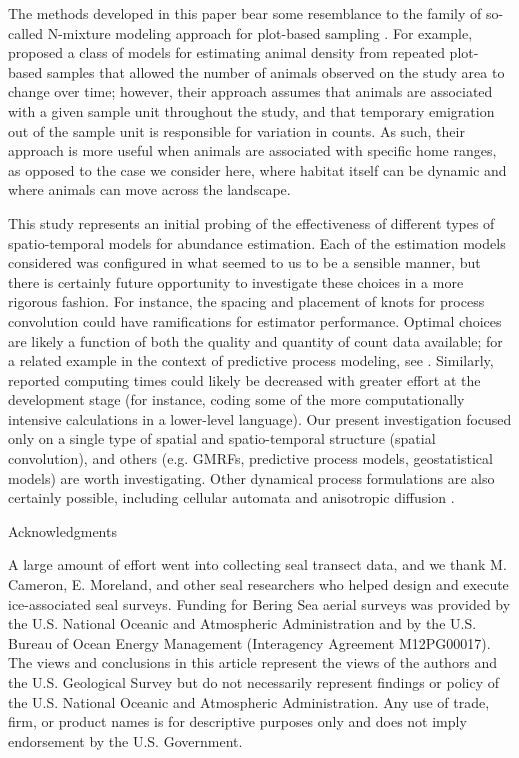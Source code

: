 \documentclass[12pt,english]{article}
\begin{document}
\begin{spacing}{1.9}
The methods developed in this paper bear some resemblance to the family of so-called N-mixture modeling approach for plot-based sampling \citep{Royle2004}.  For example, \citet{ChandlerEtAl2011} proposed a class of models for estimating animal density from repeated plot-based samples that allowed the number of animals observed on the study area to change over time; however, their approach assumes that animals are associated with a given sample unit throughout the study, and that temporary emigration out of the sample unit is responsible for variation in counts.  As such, their approach is more useful when animals are associated with specific home ranges, as opposed to the case we consider here, where habitat itself can be dynamic and where animals can move across the landscape.

This study represents an initial probing of the effectiveness of different types of spatio-temporal models for abundance estimation.  Each of the estimation models considered was configured in what seemed to us to be a sensible manner, but there is certainly future opportunity to investigate these choices in a more rigorous fashion.  For instance, the spacing and placement of knots for process convolution could have ramifications for estimator performance. Optimal choices are likely a function of both the quality and quantity of count data available; for a related example in the context of predictive process modeling, see \citet{FinleyEtAl2009}.  Similarly, reported computing times could likely be decreased with greater effort at the development stage (for instance, coding some of the more computationally intensive calculations in a lower-level language).  Our present investigation focused only on a single type of spatial and spatio-temporal structure (spatial convolution), and others (e.g. GMRFs, predictive process models, geostatistical models) are worth investigating.  Other dynamical process formulations are also certainly possible, including cellular automata \citep{HootenWikle2010} and anisotropic diffusion \citep{WikleEtAl2001}.


\centerline{\sc Acknowledgments} A large amount of effort went into collecting seal transect data, and we thank M. Cameron, E. Moreland, and other seal researchers who helped design and execute ice-associated seal surveys.  Funding
for Bering Sea aerial surveys was provided by the U.S. National Oceanic and Atmospheric
Administration and by the U.S. Bureau of Ocean Energy Management (Interagency
Agreement M12PG00017).  The views and conclusions in this article represent the views of the authors and the U.S. Geological Survey but do not necessarily represent findings or policy of the U.S. National Oceanic and Atmospheric Administration.  Any use of trade, firm, or product names is for descriptive purposes only and does not imply endorsement by the U.S. Government.


\end{spacing}
\end{document}
